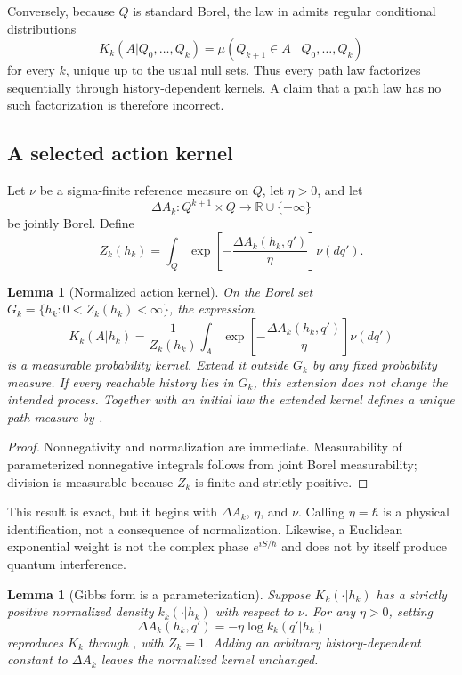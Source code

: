 \documentclass[11pt]{article}
\newtheorem{lemma}[theorem]{Lemma}
\theoremstyle{definition}
\theoremstyle{remark}
\newcommand{\R}{\mathbb{R}}
\begin{document}
Conversely, because \(Q\) is standard Borel, the law in
 admits regular conditional distributions
\[
K_k(A|Q_0,\ldots,Q_k)
=\mu(Q_{k+1}\in A\mid Q_0,\ldots,Q_k)
\]
for every \(k\), unique up to the usual null sets.  Thus every path law
factorizes sequentially through history-dependent kernels.  A claim that a
path law has no such factorization is therefore incorrect.

\subsection{A selected action kernel}

Let \(\nu\) be a sigma-finite reference measure on \(Q\), let
\(\eta>0\), and let
\[
\Delta A_k:Q^{k+1}\times Q\longrightarrow\R\cup\{+\infty\}
\]
be jointly Borel.  Define
\[
Z_k(h_k)=\int_Q
\exp\!\left[-\frac{\Delta A_k(h_k,q')}{\eta}\right]\nu(dq').
\]

\begin{lemma}[Normalized action kernel]\label{lem:action-kernel}
On the Borel set \(G_k=\{h_k:0<Z_k(h_k)<\infty\}\), the expression
\[
K_k(A|h_k)=\frac{1}{Z_k(h_k)}
\int_A\exp\!\left[-\frac{\Delta A_k(h_k,q')}{\eta}\right]\nu(dq')
\]
is a measurable probability kernel. Extend it outside \(G_k\) by any fixed
probability measure. If every reachable history lies in \(G_k\), this extension
does not change the intended process. Together with an initial law the
extended kernel defines a unique path measure by .
\end{lemma}

\begin{proof}
Nonnegativity and normalization are immediate.  Measurability of parameterized
nonnegative integrals follows from joint Borel measurability; division is
measurable because \(Z_k\) is finite and strictly positive.
\end{proof}

This result is exact, but it begins with \(\Delta A_k\), \(\eta\), and \(\nu\).
Calling \(\eta=\hbar\) is a physical identification, not a consequence of
normalization.  Likewise, a Euclidean exponential weight is not the complex
phase \(e^{iS/\hbar}\) and does not by itself produce quantum interference.

\begin{lemma}[Gibbs form is a parameterization]\label{lem:gibbs}
Suppose \(K_k(\cdot|h_k)\) has a strictly positive normalized density
\(k_k(\cdot|h_k)\) with respect to \(\nu\).  For any \(\eta>0\), setting
\[
\Delta A_k(h_k,q')=-\eta\log k_k(q'|h_k)
\]
reproduces \(K_k\) through , with \(Z_k=1\).  Adding an
arbitrary history-dependent constant to \(\Delta A_k\) leaves the normalized
kernel unchanged.
\end{lemma}
\end{document}
